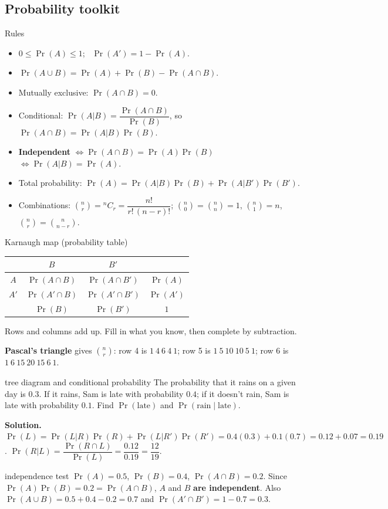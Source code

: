 \subsection{Probability toolkit}

\begin{cols}
\begin{keyres}{Rules}
\small
\begin{itemize}
  \item $0\le\Pr(A)\le1$; \ $\Pr(A')=1-\Pr(A)$.
  \item $\Pr(A\cup B)=\Pr(A)+\Pr(B)-\Pr(A\cap B)$.
  \item Mutually exclusive: $\Pr(A\cap B)=0$.
  \item Conditional: $\Pr(A|B)=\dfrac{\Pr(A\cap B)}{\Pr(B)}$, so $\Pr(A\cap B)=\Pr(A|B)\Pr(B)$.
  \item \textbf{Independent} $\iff\Pr(A\cap B)=\Pr(A)\Pr(B)$ $\iff\Pr(A|B)=\Pr(A)$.
  \item Total probability: $\Pr(A)=\Pr(A|B)\Pr(B)+\Pr(A|B')\Pr(B')$.
  \item Combinations: $\binom{n}{r}={}^nC_r=\dfrac{n!}{r!\,(n-r)!}$; $\binom{n}{0}=\binom{n}{n}=1$, $\binom{n}{1}=n$, $\binom{n}{r}=\binom{n}{n-r}$.
\end{itemize}
\end{keyres}
\nextcol
\begin{keyres}{Karnaugh map (probability table)}
\small
\centering
\begin{tabular}{c|cc|c}
 & $B$ & $B'$ & \\ \hline
$A$ & $\Pr(A\cap B)$ & $\Pr(A\cap B')$ & $\Pr(A)$\\
$A'$ & $\Pr(A'\cap B)$ & $\Pr(A'\cap B')$ & $\Pr(A')$\\ \hline
 & $\Pr(B)$ & $\Pr(B')$ & $1$
\end{tabular}
\par\smallskip\raggedright
Rows and columns add up. Fill in what you know, then complete by subtraction.\par
\textbf{Pascal's triangle} gives $\binom{n}{r}$: row 4 is $1\ 4\ 6\ 4\ 1$; row 5 is $1\ 5\ 10\ 10\ 5\ 1$; row 6 is $1\ 6\ 15\ 20\ 15\ 6\ 1$.
\end{keyres}
\end{cols}

\begin{example}{tree diagram and conditional probability \byhand}
The probability that it rains on a given day is $0.3$. If it rains, Sam is late with probability $0.4$; if it doesn't rain, Sam is late with probability $0.1$. Find $\Pr(\text{late})$ and $\Pr(\text{rain}\mid\text{late})$.

\textbf{Solution.} $\Pr(L)=\Pr(L|R)\Pr(R)+\Pr(L|R')\Pr(R')=0.4(0.3)+0.1(0.7)=0.12+0.07=0.19$.\quad
$\Pr(R|L)=\dfrac{\Pr(R\cap L)}{\Pr(L)}=\dfrac{0.12}{0.19}=\dfrac{12}{19}$.
\end{example}

\begin{example}{independence test \byhand}
$\Pr(A)=0.5$, $\Pr(B)=0.4$, $\Pr(A\cap B)=0.2$. Since $\Pr(A)\Pr(B)=0.2=\Pr(A\cap B)$, $A$ and $B$ \textbf{are independent}. Also $\Pr(A\cup B)=0.5+0.4-0.2=0.7$ and $\Pr(A'\cap B')=1-0.7=0.3$.
\end{example}
